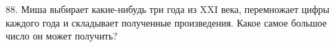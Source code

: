 88. Миша выбирает какие-нибудь три года из XXI века, перемножает цифры каждого года и складывает полученные произведения. Какое самое большое число он может получить?\\
